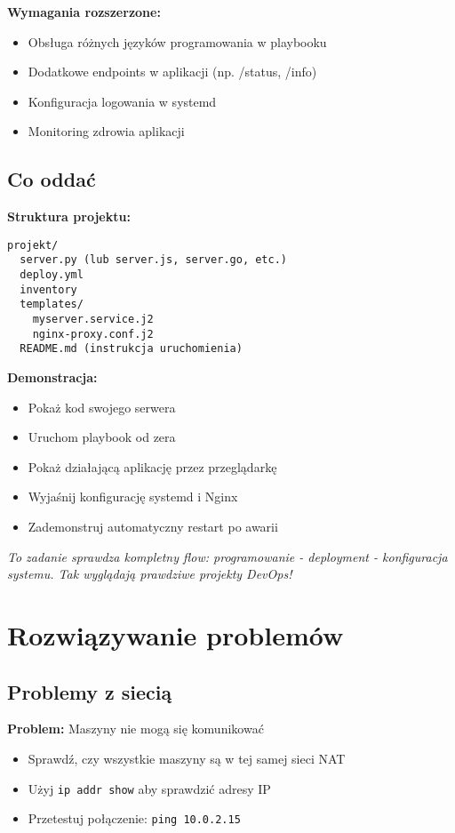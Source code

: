 \documentclass{article}
\begin{document}
\textbf{Wymagania rozszerzone:}
\begin{itemize}
    \item Obsługa różnych języków programowania w playbooku
    \item Dodatkowe endpoints w aplikacji (np. /status, /info)
    \item Konfiguracja logowania w systemd
    \item Monitoring zdrowia aplikacji
\end{itemize}

\subsection*{Co oddać}

\textbf{Struktura projektu:}
\begin{lstlisting}
projekt/
  server.py (lub server.js, server.go, etc.)
  deploy.yml
  inventory  
  templates/
    myserver.service.j2
    nginx-proxy.conf.j2
  README.md (instrukcja uruchomienia)
\end{lstlisting}

\textbf{Demonstracja:}
\begin{itemize}
    \item Pokaż kod swojego serwera
    \item Uruchom playbook od zera
    \item Pokaż działającą aplikację przez przeglądarkę
    \item Wyjaśnij konfigurację systemd i Nginx
    \item Zademonstruj automatyczny restart po awarii
\end{itemize}

\textit{To zadanie sprawdza kompletny flow: programowanie - deployment - konfiguracja systemu. Tak wyglądają prawdziwe projekty DevOps!}

\section{Rozwiązywanie problemów}

\subsection*{Problemy z siecią}
\textbf{Problem:} Maszyny nie mogą się komunikować
\begin{itemize}
    \item Sprawdź, czy wszystkie maszyny są w tej samej sieci NAT
    \item Użyj \texttt{ip addr show} aby sprawdzić adresy IP
    \item Przetestuj połączenie: \texttt{ping 10.0.2.15}
\end{itemize}
\end{document}
